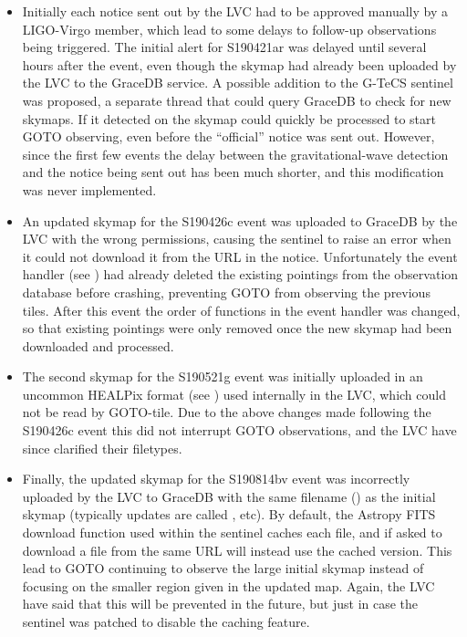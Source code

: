 \begin{colsection}
\begin{itemize}
    \item Initially each notice sent out by the LVC had to be approved manually by a LIGO-Virgo member, which lead to some delays to follow-up observations being triggered. The initial alert for S190421ar was delayed until several hours after the event, even though the skymap had already been uploaded by the LVC to the GraceDB service. A possible addition to the G-TeCS sentinel was proposed, a separate thread that could query GraceDB to check for new skymaps. If it detected on the skymap could quickly be processed to start GOTO observing, even before the ``official'' notice was sent out. However, since the first few events the delay between the gravitational-wave detection and the notice being sent out has been much shorter, and this modification was never implemented.
    \item An updated skymap for the S190426c event was uploaded to GraceDB by the LVC with the wrong permissions, causing the sentinel to raise an error when it could not download it from the URL in the notice. Unfortunately the event handler (see ) had already deleted the existing pointings from the observation database before crashing, preventing GOTO from observing the previous tiles. After this event the order of functions in the event handler was changed, so that existing pointings were only removed once the new skymap had been downloaded and processed.
    \item The second skymap for the S190521g event was initially uploaded in an uncommon HEALPix format (see ) used internally in the LVC, which could not be read by GOTO-tile. Due to the above changes made following the S190426c event this did not interrupt GOTO observations, and the LVC have since clarified their filetypes.
    \item Finally, the updated skymap for the S190814bv event was incorrectly uploaded by the LVC to GraceDB with the same filename () as the initial skymap (typically updates are called , etc). By default, the Astropy FITS download function used within the sentinel caches each file, and if asked to download a file from the same URL will instead use the cached version. This lead to GOTO continuing to observe the large initial skymap instead of focusing on the smaller region given in the updated map. Again, the LVC have said that this will be prevented in the future, but just in case the sentinel was patched to disable the caching feature.
\end{itemize}

\end{colsection}

